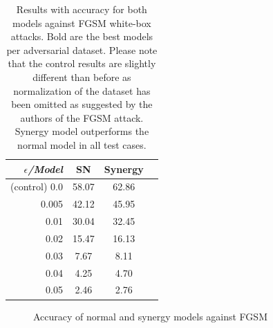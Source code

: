 \documentclass[b5paper]{book}
\begin{document}
\begin{table}[ht]
  \centering
  \begin{tabular}{rS[table-format=2.1]S[table-format=2.1]S[table-format=2.1]}
    \toprule
     \textit{\(\epsilon\)/Model} & {SN} & {Synergy} \\
    \midrule
    {(control) 0.0} & {58.07} & {62.86} \\
    {0.005} & {42.12} & {45.95} \\
    {0.01} & {30.04} & {32.45} \\
    {0.02} & {15.47} & {16.13} \\
    {0.03} & {7.67} & {8.11} \\
    {0.04} & {4.25} & {4.70} \\
    {0.05} & {2.46} & {2.76} \\
    \bottomrule
  \end{tabular}
  \caption{Results with accuracy for both models against FGSM white-box attacks. Bold are the best models per adversarial dataset. Please note that the control results are slightly different than before as normalization of the dataset has been omitted as suggested by the authors of the FGSM attack. Synergy model outperforms the normal model in all test cases.}
  \label{tab:results-fgsm-synergy}
\end{table} 

\begin{figure}
    \centering
    \caption{Accuracy of normal and synergy models against FGSM}
    \label{fig:fgsm_chart_synergy}
\end{figure}
\end{document}
